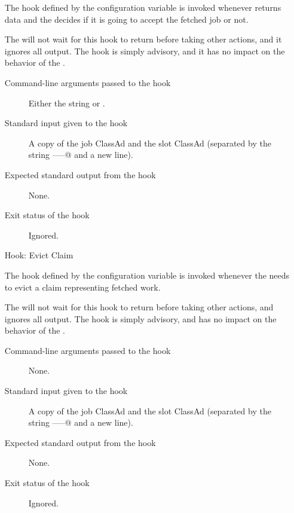 \begin{itemize}
The hook defined by the configuration variable
 is invoked whenever
 returns data and the 
decides if it is going to accept the fetched job or not.

The  will not wait for this hook to return before
taking other actions, and it ignores all output.
The hook is simply advisory, and it has no impact on the behavior of the
.

\begin{description}
\item[Command-line arguments passed to the hook]
  Either the string \verb@accept@ or \verb@reject@.

\item[Standard input given to the hook]
  A copy of the job ClassAd and the slot ClassAd
  (separated by the string \verb@-----@ and a new line).

\item[Expected standard output from the hook]
  None.

\item[Exit status of the hook]
  Ignored.
\end{description}


\item[Hook: Evict Claim]

The hook defined by the configuration variable
 is invoked whenever the 
needs to evict a claim representing fetched work.

The  will not wait for this hook to return before
taking other actions, and ignores all output.
The hook is simply advisory, and has no impact on the behavior of the
.

\begin{description}
\item[Command-line arguments passed to the hook]
  None.

\item[Standard input given to the hook]
  A copy of the job ClassAd and the slot ClassAd
  (separated by the string \verb@-----@ and a new line).

\item[Expected standard output from the hook]
  None.

\item[Exit status of the hook]
  Ignored.
\end{description}



\end{itemize}
